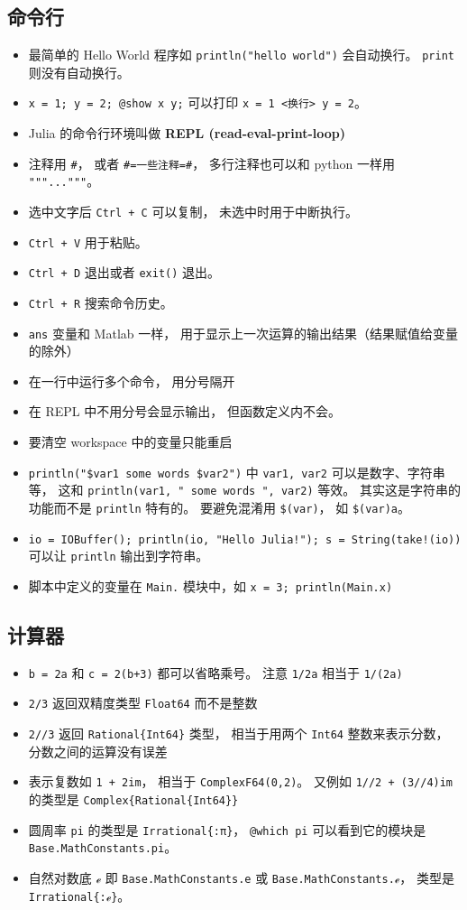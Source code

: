 \subsection{命令行}
\begin{itemize}
\item 最简单的 Hello World 程序如 \verb`println("hello world")` 会自动换行。 \verb`print` 则没有自动换行。
\item \verb`x = 1; y = 2; @show x y;` 可以打印 \verb`x = 1 <换行> y = 2`。
\item Julia 的命令行环境叫做 \textbf{REPL (read-eval-print-loop)}
\item 注释用 \verb`#`， 或者 \verb`#=一些注释=#`， 多行注释也可以和 python 一样用 \verb`"""..."""`。
\item 选中文字后 \verb`Ctrl + C` 可以复制， 未选中时用于中断执行。
\item \verb`Ctrl + V` 用于粘贴。
\item \verb`Ctrl + D` 退出或者 \verb`exit()` 退出。
\item \verb`Ctrl + R` 搜索命令历史。
\item \verb`ans` 变量和 Matlab 一样， 用于显示上一次运算的输出结果（结果赋值给变量的除外）
\item 在一行中运行多个命令， 用分号隔开
\item 在 REPL 中不用分号会显示输出， 但函数定义内不会。
\item 要清空 workspace 中的变量只能重启
\item \verb`println("$var1 some words $var2")` 中 \verb`var1, var2` 可以是数字、字符串等， 这和 \verb`println(var1, " some words ", var2)` 等效。 其实这是字符串的功能而不是 \verb`println` 特有的。 要避免混淆用 \verb`$(var)`， 如 \verb`$(var)a`。
\item \verb`io = IOBuffer(); println(io, "Hello Julia!"); s = String(take!(io))` 可以让 \verb`println` 输出到字符串。
\item 脚本中定义的变量在 \verb`Main.` 模块中，如 \verb`x = 3; println(Main.x)`
\end{itemize}

\subsection{计算器}
\begin{itemize}
\item \verb`b = 2a` 和 \verb`c = 2(b+3)` 都可以省略乘号。 注意 \verb`1/2a` 相当于 \verb`1/(2a)`
\item \verb`2/3` 返回双精度类型 \verb`Float64` 而不是整数
\item \verb`2//3` 返回 \verb`Rational{Int64}` 类型， 相当于用两个 \verb`Int64` 整数来表示分数， 分数之间的运算没有误差
\item 表示复数如 \verb`1 + 2im`， 相当于 \verb`ComplexF64(0,2)`。 又例如 \verb`1//2 + (3//4)im` 的类型是 \verb`Complex{Rational{Int64}}`
\item 圆周率 \verb`pi` 的类型是 \verb`Irrational{:π}`， \verb`@which pi` 可以看到它的模块是 \verb`Base.MathConstants.pi`。
\item 自然对数底 \verb`ℯ` 即 \verb`Base.MathConstants.e` 或 \verb`Base.MathConstants.ℯ`， 类型是 \verb`Irrational{:ℯ}`。
\end{itemize}

